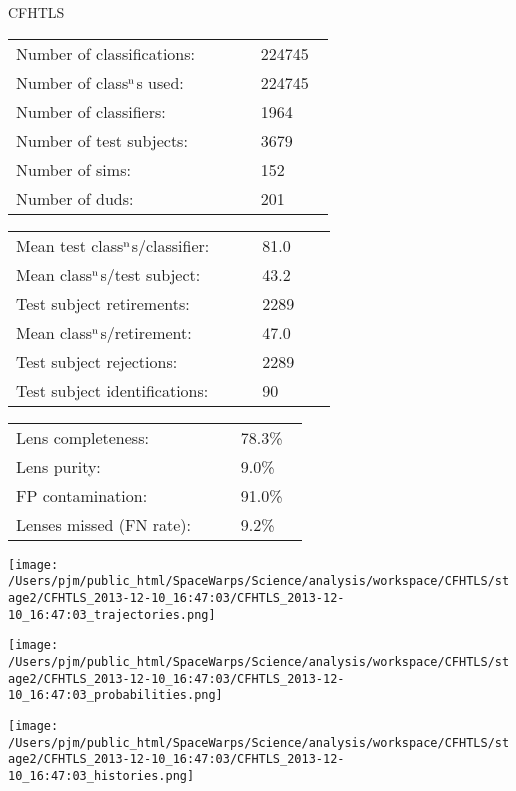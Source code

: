 \documentclass[letterpaper,12pt]{article}
\begin{document}
\begin{minipage}{0.42\linewidth}
{\LARGE CFHTLS}\newline
\medskip

\begin{tabular}{|p{0.65\linewidth}p{0.2\linewidth}|}
\hline
Number of classifications:         & 224745   \\ 
Number of class$^{\rm n}$s used:  & 224745   \\ 
Number of classifiers:             & 1964   \\ 
Number of test subjects:           & 3679   \\ 
Number of sims:                    & 152   \\ 
Number of duds:                    & 201   \\ 
\hline
\end{tabular}
\begin{tabular}{|p{0.65\linewidth}p{0.2\linewidth}|}
\hline
Mean test class$^{\rm n}$s/classifier: & 81.0 \\ 
Mean class$^{\rm n}$s/test subject:    & 43.2 \\ 
Test subject retirements:               & 2289   \\ 
Mean class$^{\rm n}$s/retirement:      & 47.0 \\ 
Test subject rejections:                & 2289   \\ 
Test subject identifications:           & 90   \\ 
\hline
\end{tabular}
\begin{tabular}{|p{0.65\linewidth}p{0.2\linewidth}|}
\hline
Lens completeness:         & 78.3\% \\ 
Lens purity:               & 9.0\% \\ 
FP contamination:          & 91.0\% \\ 
Lenses missed (FN rate):   & 9.2\% \\ 
\hline
\end{tabular}
\end{minipage}\hfill
\begin{minipage}{0.56\linewidth}
\texttt{[image: /Users/pjm/public\_html/SpaceWarps/Science/analysis/workspace/CFHTLS/stage2/CFHTLS\_2013-12-10\_16:47:03/CFHTLS\_2013-12-10\_16:47:03\_trajectories.png]}
\end{minipage}

\vspace{-1\baselineskip}
\begin{minipage}{\linewidth}
\begin{minipage}{0.48\linewidth}
\texttt{[image: /Users/pjm/public\_html/SpaceWarps/Science/analysis/workspace/CFHTLS/stage2/CFHTLS\_2013-12-10\_16:47:03/CFHTLS\_2013-12-10\_16:47:03\_probabilities.png]}
\end{minipage}
\begin{minipage}{0.48\linewidth}
\texttt{[image: /Users/pjm/public\_html/SpaceWarps/Science/analysis/workspace/CFHTLS/stage2/CFHTLS\_2013-12-10\_16:47:03/CFHTLS\_2013-12-10\_16:47:03\_histories.png]}
\end{minipage}
\end{minipage}
\end{document}
